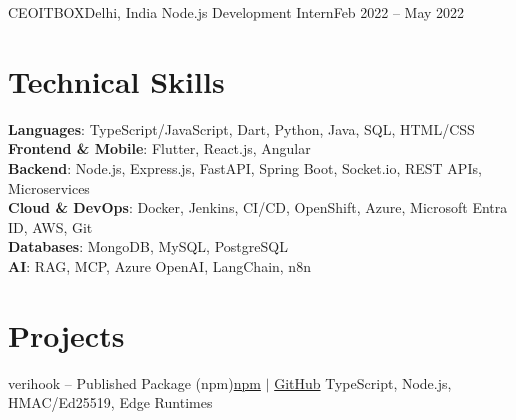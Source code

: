 \documentclass[a4paper,10pt]{article}
\begin{document}
    \resumeSubheading
      {CEOITBOX}{Delhi, India}
      {Node.js Development Intern}{Feb 2022 -- May 2022}
      \resumeItemListStart
      \resumeItemListEnd

  \resumeSubHeadingListEnd

\section{Technical Skills}
 \begin{itemize}[leftmargin=0.15in, label={}]
    \small{\item{
     \textbf{Languages}{: TypeScript/JavaScript, Dart, Python, Java, SQL, HTML/CSS} \\
     \textbf{Frontend \& Mobile}{: Flutter, React.js, Angular} \\
     \textbf{Backend}{: Node.js, Express.js, FastAPI, Spring Boot, Socket.io, REST APIs, Microservices} \\
     \textbf{Cloud \& DevOps}{: Docker, Jenkins, CI/CD, OpenShift, Azure, Microsoft Entra ID, AWS, Git} \\
     \textbf{Databases}{: MongoDB, MySQL, PostgreSQL} \\
     \textbf{AI}{: RAG, MCP, Azure OpenAI, LangChain, n8n}
    }}
 \end{itemize}

\section{Projects}
  \resumeSubHeadingListStart

    \resumeSubheading
      {verihook -- Published Package (npm)}{\href{https://www.npmjs.com/package/verihook}{npm} $|$ \href{https://github.com/creatorpiyush/verihook}{GitHub}}
      {TypeScript, Node.js, HMAC/Ed25519, Edge Runtimes}{}
      \resumeItemListStart
      \resumeItemListEnd
\end{document}
